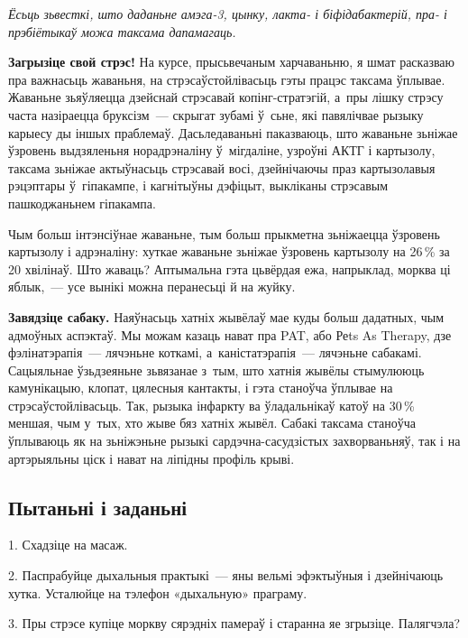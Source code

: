 \emph{Ёсьць зьвесткі, што даданьне амэга-3, цынку, лакта- і біфідабактерій, пра- і прэбіётыкаў можа таксама дапамагаць.}

\textbf{Загрызіце свой стрэс!} На курсе, прысьвечаным харчаваньню, я шмат расказваю пра важнасьць жаваньня, на стрэсаўстойлівасьць гэты працэс таксама ўплывае. Жаваньне зьяўляецца дзейснай стрэсавай копінг-стратэгій, а~пры лішку стрэсу часта назіраецца бруксізм~--- скрыгат зубамі ў~сьне, які павялічвае рызыку карыесу ды іншых праблемаў. Дасьледаваньні паказваюць, што жаваньне зьніжае ўзровень выдзяленьня норадрэналіну ў~мігдаліне, узроўні АКТГ і картызолу, таксама зьніжае актыўнасьць стрэсавай восі, дзейнічаючы праз картызолавыя рэцэптары ў~гіпакампе, і кагнітыўны дэфіцыт, выкліканы стрэсавым пашкоджаньнем гіпакампа.

Чым больш інтэнсіўнае жаваньне, тым больш прыкметна зьніжаецца ўзровень картызолу і адрэналіну: хуткае жаваньне зьніжае ўзровень картызолу на 26\,\% за 20 хвілінаў. Што жаваць? Аптымальна гэта цьвёрдая ежа, напрыклад, морква ці яблык,~--- усе вынікі можна перанесьці й на жуйку.

\textbf{Завядзіце сабаку.} Наяўнасьць хатніх жывёлаў мае куды больш дадатных, чым адмоўных аспэктаў. Мы можам казаць нават пра PAT, або Реts As Therapy, дзе фэлінатэрапія~--- лячэньне коткамі, а~каністатэрапія~--- лячэньне сабакамі. Сацыяльнае ўзьдзеяньне зьвязанае з~тым, што хатнія жывёлы стымулююць камунікацыю, клопат, цялесныя кантакты, і гэта станоўча ўплывае на стрэсаўстойлівасьць. Так, рызыка інфаркту ва ўладальнікаў катоў на 30\,\% меншая, чым у~тых, хто жыве бяз хатніх жывёл. Сабакі таксама станоўча ўплываюць як на зьніжэньне рызыкі сардэчна-сасудзістых захворваньняў, так і на артэрыяльны ціск і нават на ліпідны профіль крыві.


\subsection*{Пытаньні і заданьні}

1. Схадзіце на масаж.

2. Паспрабуйце дыхальныя практыкі~--- яны вельмі эфэктыўныя і дзейнічаюць хутка. Усталюйце на тэлефон «дыхальную» праграму.

3. Пры стрэсе купіце моркву сярэдніх памераў і старанна яе згрызіце. Палягчэла?

